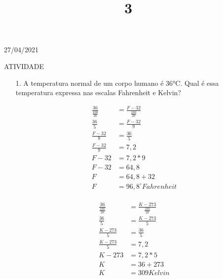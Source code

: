 \documentclass{SchoolBook}
\begin{document}
    \begin{day}{27/04/2021}
        \title{3}{ATIVIDADE}
        
        \begin{enumerate}
            \item[1.] A temperatura normal de um corpo humano é 36°C. Qual é essa temperatura expressa nas escalas Fahrenheit e Kelvin?
            \begin{multicols}{2}
                \begin{align*}
                    \frac{36}{\frac{100}{20}} &= \frac{F - 32}{\frac{180}{20}} \\
                                 \frac{36}{5} &= \frac{F - 32}{9}              \\
                             \frac{F - 32}{9} &= \frac{36}{5}                  \\
                             \frac{F - 32}{9} &= 7,2                           \\
                                       F - 32 &= 7,2 * 9                       \\
                                       F - 32 &= 64,8                          \\
                                            F &= 64,8 + 32                     \\
                                            F &= 96,8 ^\circ Fahrenheit
                \end{align*}\\
                \begin{align*}
                    \frac{36}{\frac{100}{20}} &= \frac{K - 273}{\frac{100}{20}} \\
                                 \frac{36}{5} &= \frac{K - 273}{5}              \\
                            \frac{K - 273}{5} &= \frac{36}{5}                   \\
                            \frac{K - 273}{5} &= 7,2                            \\
                                      K - 273 &= 7,2 * 5                        \\
                                            K &= 36 + 273                       \\
                                            K &= 309 Kelvin
                \end{align*}
            \end{multicols}
            

\end{enumerate}
\end{day}
\end{document}
